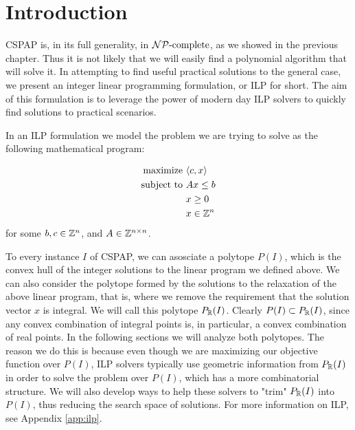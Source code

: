 \section{Introduction}
CSPAP is, in its full generality, in $\mathcal{NP}{\text{-complete}}$, as we showed in the previous chapter. Thus it is not likely that we will easily find a polynomial algorithm that will solve it. In attempting to find useful practical solutions to the general case, we present an integer linear programming formulation, or ILP for short. The aim of this formulation is to leverage the power of modern day ILP solvers to quickly find solutions to practical scenarios.

In an ILP formulation we model the problem we are trying to solve as the following mathematical program:

\begin{alignat*}{2}
\text{maximize } & \langle c, x \rangle\\
\text{subject to } & A x \le b\\
                   & x \ge 0\\
                   & x \in \mathbb{Z}^n
\end{alignat*}
for some $b, c \in \mathbb{Z}^n$, and $A \in \mathbb{Z}^{n \times n}$.

To every instance $I$ of CSPAP, we can asosciate a polytope $P(I)$, which is the convex hull of the integer solutions to the linear program we defined above. We can also consider the polytope formed by the solutions to the relaxation of the above linear program, that is, where we remove the requirement that the solution vector $x$ is integral. We will call this polytope $P_{\mathbb{R}}(I)$. Clearly  $P(I) \subset P_{\mathbb{R}}(I)$, since any convex combination of integral points is, in particular, a convex combination of real points. In the following sections we will analyze both polytopes. The reason we do this is because even though we are maximizing our objective function over $P(I)$, ILP solvers typically use geometric information from $P_{\mathbb{R}}(I)$ in order to solve the problem over $P(I)$, which has a more combinatorial structure. We will also develop ways to help these solvers to "trim" $P_{\mathbb{R}}(I)$ into $P(I)$, thus reducing the search space of solutions. For more information on ILP, see Appendix \ref{app:ilp}.
